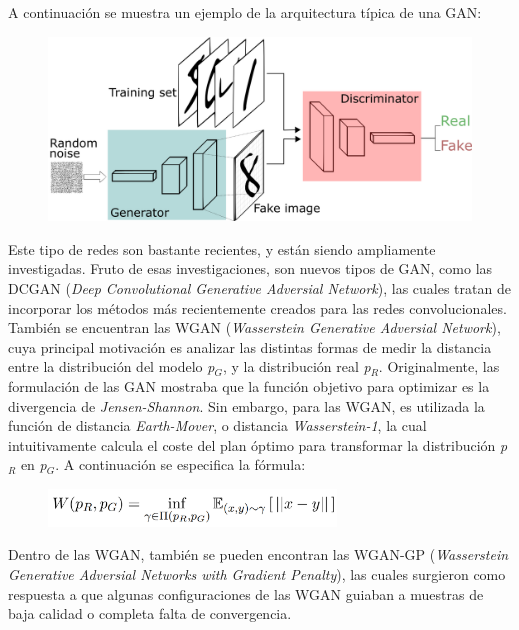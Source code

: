\documentclass[spanish,a4paper, 11pt]{article}
\numberwithin{equation}{section}
\numberwithin{table}{section}
\numberwithin{figure}{section}
\begin{document}
	
	A continuación se muestra un ejemplo de la arquitectura típica de una GAN:
	
\begin{figure}[H]
 	\centering
	\includegraphics[width=\linewidth]{gan.png}
	\label{fig:gan}
\end{figure}	
	
	
Este tipo de redes son bastante recientes, y están siendo ampliamente investigadas. Fruto de esas investigaciones, son nuevos tipos de GAN, como las DCGAN (\textit{Deep Convolutional Generative Adversial Network}), las cuales tratan de incorporar los métodos más recientemente creados para las redes convolucionales.\\
	
También se encuentran las WGAN (\textit{Wasserstein Generative Adversial Network}), cuya principal motivación es analizar las distintas formas de medir la distancia entre la distribución del modelo \textit{p$_{G}$}, y la distribución real \textit{p$_{R}$}. Originalmente, las formulación de las GAN mostraba que la función objetivo para optimizar es la divergencia de \textit{Jensen-Shannon}. Sin embargo, para las WGAN, es utilizada la función de distancia \textit{Earth-Mover}, o distancia \textit{Wasserstein-1}, la cual intuitivamente calcula el coste del plan óptimo para transformar la distribución \textit{p$_{R}$} en \textit{p$_{G}$}. A continuación se especifica la fórmula:
	
\begin{figure}[H]
 	\centering
	\includegraphics[height=1cm]{wasserstein.png}
	\label{fig:wasserstein}
\end{figure}	
	
	
Dentro de las WGAN, también se pueden encontran las WGAN-GP (\textit{Wasserstein Generative Adversial Networks with Gradient Penalty}), las cuales surgieron como respuesta a que algunas configuraciones de las WGAN guiaban a muestras de baja calidad o completa falta de convergencia.
	
\end{document}
